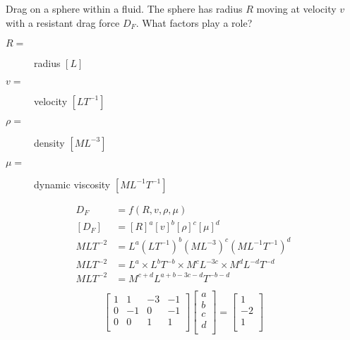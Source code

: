 \documentclass[
	date={August 26{,} 2024}
]{math486notes}
\begin{document}
\begin{example}
	Drag on a sphere within a fluid.
	The sphere has radius $R$ moving at velocity $v$ with a resistant drag force $D_{F}$.
	What factors play a role?
	\begin{description}
		\item[$R=$] radius $[L]$
		\item[$v=$] velocity $[LT^{-1}]$
		\item[$\rho=$] density $[ML^{-3}]$
		\item[$\mu=$] dynamic viscosity $[ML^{-1}T^{-1}]$
	\end{description}
	\begin{equation*}
	\begin{aligned}
		D_{F} &= f(R, v, \rho, \mu)\\
		[D_{F}] &= [R]^{a}[v]^{b}[\rho]^{c}[\mu]^{d}\\
		MLT^{-2} &= L^{a}\left( LT^{-1} \right)^{b}\left( ML^{-3} \right)^{c}\left( ML^{-1}T^{-1} \right)^{d}\\
		MLT^{-2} &= L^{a}\times L^{b}T^{-b}\times M^{c}L^{-3c} \times M^{d}L^{-d}T^{-d}\\
		MLT^{-2} &= M^{c+d}L^{a+b-3c-d}T^{-b-d}\\
	\end{aligned}
	\end{equation*}
	\begin{equation*}
	\begin{aligned}
		\left[ \begin{array}{rrrr}
			1 & 1 & -3 & -1\\
			0 & -1 & 0 & -1\\
			0 & 0 & 1 & 1\\
		\end{array} \right]\left[ \begin{array}{c}
			a\\
			b\\
			c\\
			d\\
		\end{array} \right] = \left[ \begin{array}{r}
			1\\
			-2\\
			1\\
		\end{array} \right]
	\end{aligned}
	\end{equation*}
	\begin{equation*}
	\begin{aligned}

\end{aligned}
\end{equation*}
\end{example}
\end{document}
